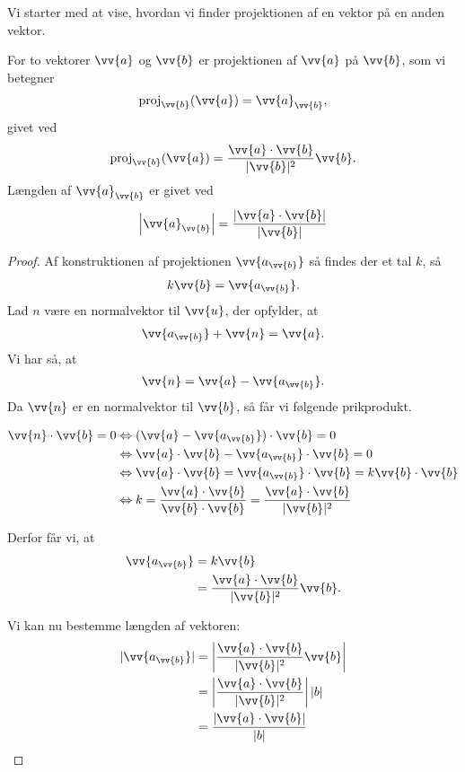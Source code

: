 Vi starter med at vise, hvordan vi finder projektionen af en vektor på en anden vektor. 
\begin{setn}[Projektionssætningen]
For to vektorer $\vv{a}$ og $\vv{b}$ er projektionen af $\vv{a}$ på $\vv{b}$, som vi betegner
\begin{align*}
\textnormal{proj}_{\vv{b}}(\vv{a}) = \vv{a}_{\vv{b}}, 
\end{align*}
givet ved
\begin{align*}
\textnormal{proj}_{\vv{b}}(\vv{a}) = \frac{\vv{a}\cdot \vv{b}}{|\vv{b}|^2} \vv{b}.
\end{align*}
Længden af  $\vv{a}_{\vv{b}}$ er givet ved
\begin{align*}
\left|\vv{a}_{\vv{b}}\right| = \frac{|\vv{a}\cdot \vv{b}|}{|\vv{b}|}
\end{align*}
\end{setn}
\begin{proof}
Af konstruktionen af projektionen $\vv{a_{\vv{b}}}$ så findes der et tal $k$, så 
\begin{align*}
k\vv{b} = \vv{a_{\vv{b}}}.
\end{align*}
Lad $n$ være en normalvektor til $\vv{u}$, der opfylder, at 
\begin{align*}
\vv{a_{\vv{b}}} + \vv{n} = \vv{a}.
\end{align*}
Vi har så, at 
\begin{align*}
\vv{n} = \vv{a} - \vv{a_{\vv{b}}}.
\end{align*}
Da $\vv{n}$ er en normalvektor til $\vv{b}$, så får vi følgende prikprodukt.

\begin{align*}
\vv{n} \cdot \vv{b}=0 &\Leftrightarrow (\vv{a}-\vv{a_{\vv{b}}}) \cdot \vv{b} = 0 \\
&\Leftrightarrow \vv{a}\cdot \vv{b} - \vv{a_{\vv{b}}}\cdot \vv{b} = 0 \\
&\Leftrightarrow \vv{a}\cdot \vv{b} = \vv{a_{\vv{b}}}\cdot \vv{b} = k \vv{b} \cdot \vv{b} \\
&\Leftrightarrow k  = \frac{\vv{a}\cdot \vv{b}}{\vv{b} \cdot \vv{b}} = \frac{\vv{a}\cdot \vv{b}}{|\vv{b}|^2}
\end{align*}

Derfor får vi, at 
\begin{align*}
\vv{a_{\vv{b}}} &= k \vv{b}\\
&= \frac{\vv{a}\cdot \vv{b}}{|\vv{b}|^2} \vv{b}.
\end{align*} 

Vi kan nu bestemme længden af vektoren:
\begin{align*}
|\vv{a_{\vv{b}}}| &= \left|\frac{\vv{a}\cdot \vv{b}}{|\vv{b}|^2}\vv{b}\right|\\
&= \left|\frac{\vv{a}\cdot \vv{b}}{|\vv{b}|^2}\right||b| \\
&= \frac{|\vv{a} \cdot \vv{b}|}{|b|}
\end{align*}
\end{proof}

